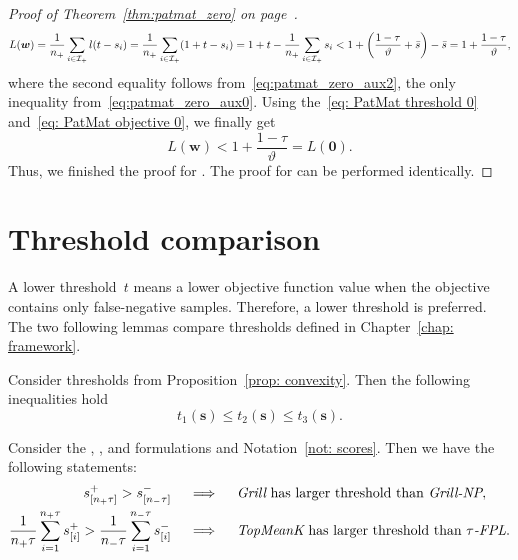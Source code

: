 \begin{proof}[Proof of Theorem~\ref{thm:patmat_zero} on page~\pageref{thm:patmat_zero}]
\begin{equation*}
    L(\bm{w})
      = \frac{1}{\npos}\sum_{i \in \Ipos}l(t-s_i)
      = \frac{1}{\npos}\sum_{i \in \Ipos}\Brac{1+t-s_i}
      = 1 + t - \frac{1}{\npos}\sum_{i \in \Ipos} s_i
      < 1 + \Brac{\frac{1 - \tau}{\vartheta} + \bar{s}} - \bar{s}
      = 1 + \frac{1-\tau}{\vartheta},  
  \end{equation*}
  where the second equality follows from~\eqref{eq:patmat_zero_aux2}, the only inequality from~\eqref{eq:patmat_zero_aux0}. Using the~\eqref{eq: PatMat threshold 0} and~\eqref{eq: PatMat objective 0}, we finally get
  \begin{equation*}
    L(\bm{w})
      < 1 + \frac{1-\tau}{\vartheta}
      = L(\bm{0}).
  \end{equation*}
  Thus, we finished the proof for \PatMat. The proof for \PatMatNP can be performed identically.
\end{proof}

\section{Threshold comparison}\label{app:relations}

A lower threshold~$t$ means a lower objective function value when the objective contains only false-negative samples. Therefore, a lower threshold is preferred. The two following lemmas compare thresholds defined in Chapter~\ref{chap: framework}.

\begin{lemma}\label{prop: threholds}
  Consider thresholds from Proposition~\ref{prop: convexity}. Then the following inequalities hold
  \begin{equation*}
    t_1(\bm{s}) \leq t_2(\bm{s}) \leq t_3(\bm{s}).
  \end{equation*}
\end{lemma}

\begin{lemma}\label{lemma:thresholds2}
  Consider the \Grill, \GrillNP, \TopMeanK and \tauFPL formulations and Notation~\ref{not: scores}. Then we have the following statements:
  \begin{equation*}
    \begin{aligned}
      s_{[n_{+}\tau]}^+ > s_{[n_{-}\tau]}^- \quad
        & \implies \quad \emph{Grill} \text{ has larger threshold than }\emph{Grill-NP}, \\
      \frac{1}{n_{+}\tau}\sum_{i=1}^{n_{+}\tau} s_{[i]}^+
      > \frac{1}{n_{-}\tau}\sum_{i=1}^{n_{-}\tau} s_{[i]}^- \quad
        & \implies \quad \emph{TopMeanK} \text{ has larger threshold than }{\emph{$\tau$-FPL}}. \\
    \end{aligned}
  \end{equation*}
\end{lemma}

